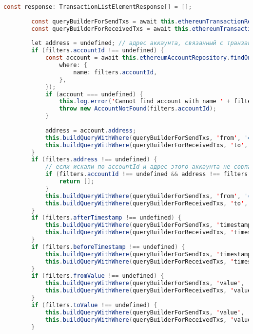 \begin{lstlisting}[language=java]
		const response: TransactionListElementResponse[] = [];
		
		const queryBuilderForSendTxs = await this.ethereumTransactionRepository.createQueryBuilder('ethereum_transaction');
		const queryBuilderForReceivedTxs = await this.ethereumTransactionRepository.createQueryBuilder('ethereum_transaction');
		
		let address = undefined; // адрес аккаунта, связанный с транзакциями. Будет определен ниже, если искали по accountId
		if (filters.accountId !== undefined) {
			const account = await this.ethereumAccountRepository.findOne({
				where: {
					name: filters.accountId,
				},
			});
			if (account === undefined) {
				this.log.error('Cannot find account with name ' + filters.accountId + ' (ethereum)', [{method: 'getTransactions'}]);
				throw new AccountNotFound(filters.accountId);
			}
			
			address = account.address;
			this.buildQueryWithWhere(queryBuilderForSendTxs, 'from', '=', 'fromField', address);
			this.buildQueryWithWhere(queryBuilderForReceivedTxs, 'to', '=', 'toField', address);
		}
		if (filters.address !== undefined) {
			// если искали по accountId и адрес этого аккаунта не совпадает с адресом из фильтра
			if (filters.accountId !== undefined && address !== filters.address) {
				return [];
			}
			this.buildQueryWithWhere(queryBuilderForSendTxs, 'from', '=', 'fromField', filters.address);
			this.buildQueryWithWhere(queryBuilderForReceivedTxs, 'to', '=', 'toField', filters.address);
		}
		if (filters.afterTimestamp !== undefined) {
			this.buildQueryWithWhere(queryBuilderForSendTxs, 'timestamp', '>=', 'timestampField', filters.afterTimestamp as number);
			this.buildQueryWithWhere(queryBuilderForReceivedTxs, 'timestamp', '>=', 'timestampField', filters.afterTimestamp as number);
		}
		if (filters.beforeTimestamp !== undefined) {
			this.buildQueryWithWhere(queryBuilderForSendTxs, 'timestamp', '<=', 'beforeTimestampField', filters.beforeTimestamp as number);
			this.buildQueryWithWhere(queryBuilderForReceivedTxs, 'timestamp', '<=', 'beforeTimestampField', filters.beforeTimestamp as number);
		}
		if (filters.fromValue !== undefined) {
			this.buildQueryWithWhere(queryBuilderForSendTxs, 'value', '>=', 'fromValueField', filters.fromValue as number);
			this.buildQueryWithWhere(queryBuilderForReceivedTxs, 'value', '>=', 'fromValueField', filters.fromValue as number);
		}
		if (filters.toValue !== undefined) {
			this.buildQueryWithWhere(queryBuilderForSendTxs, 'value', '<=', 'toValueField', filters.toValue as number);
			this.buildQueryWithWhere(queryBuilderForReceivedTxs, 'value', '<=', 'toValueField', filters.toValue as number);
		}
		

\end{lstlisting}
